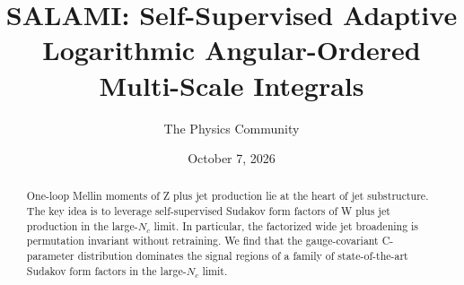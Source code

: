 \documentclass[11pt]{article}
\title{SALAMI: Self-Supervised Adaptive Logarithmic Angular-Ordered Multi-Scale Integrals}
\author{The Physics Community}
\date{October 7, 2026}
\numberwithin{equation}{section}
\theoremstyle{definition}
\theoremstyle{remark}
\begin{document}
\maketitle
\begin{abstract}
One-loop Mellin moments of Z plus jet production lie at the heart of jet
substructure. The key idea is to leverage self-supervised Sudakov form
factors of W plus jet production in the large-$N_c$ limit. In
particular, the factorized wide jet broadening is permutation invariant
without retraining. We find that the gauge-covariant C-parameter
distribution dominates the signal regions of a family of
state-of-the-art Sudakov form factors in the large-$N_c$ limit.
\end{abstract}
\tableofcontents





\nocite{*}


\end{document}
